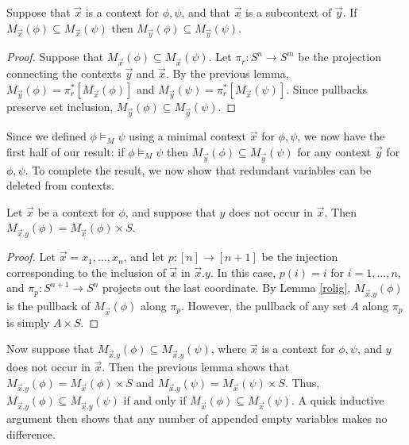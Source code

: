 \begin{prop} Suppose that $\vec{x}$ is a context for $\phi ,\psi$, and
  that $\vec{x}$ is a subcontext of $\vec{y}$.  If
  $M_{\vec{x}}(\phi )\subseteq M_{\vec{x}}(\psi )$ then
  $M_{\vec{y}}(\phi )\subseteq M_{\vec{y}}(\psi
  )$. \label{subcon} \end{prop}

\begin{proof} Suppose that
  $M_{\vec{x}}(\phi )\subseteq M_{\vec{x}}(\psi )$.  Let
  $\pi _r:S^n\to S^m$ be the projection connecting the contexts
  $\vec{y}$ and $\vec{x}$.  By the previous lemma,
  $M_{\vec{y}}(\phi )=\pi _r^*[M_{\vec{x}}(\phi )]$ and
  $M_{\vec{y}}(\psi )=\pi _r^*[M_{\vec{x}}(\psi )]$.  Since pullbacks
  preserve set inclusion,
  $M_{\vec{y}}(\phi )\subseteq M_{\vec{y}}(\psi )$.  \end{proof}

Since we defined $\phi\vDash _M\psi$ using a minimal context $\vec{x}$
for $\phi ,\psi$, we now have the first half of our result: if
$\phi\vDash _M\psi$ then
$M_{\vec{y}}(\phi )\subseteq M_{\vec{y}}(\psi )$ for any context
$\vec{y}$ for $\phi ,\psi$.  To complete the result, we now show that
redundant variables can be deleted from contexts.

\begin{lemma} Let $\vec{x}$ be a context for $\phi$, and suppose that
  $y$ does not occur in $\vec{x}$.  Then
  $M_{\vec{x}.y}(\phi )=M_{\vec{x}}(\phi )\times S$.  \end{lemma}



\begin{proof} Let $\vec{x}=x_1,\dots ,x_n$, and let $p:[n]\to [n+1]$
  be the injection corresponding to the inclusion of $\vec{x}$ in
  $\vec{x}.y$.  In this case, $p(i)=i$ for $i=1,\dots ,n$, and
  $\pi _p:S^{n+1}\to S^n$ projects out the last coordinate.  By Lemma
  \ref{rolig}, $M_{\vec{x}.y}(\phi )$ is the pullback of
  $M_{\vec{x}}(\phi )$ along $\pi _p$.  However, the pullback of any
  set $A$ along $\pi _p$ is simply $A\times S$. \end{proof}

Now suppose that $M_{\vec{x}.y}(\phi )\subseteq M_{\vec{x}.y}(\psi )$,
where $\vec{x}$ is a context for $\phi ,\psi$, and $y$ does not occur
in $\vec{x}$.  Then the previous lemma shows that
$M_{\vec{x}.y}(\phi )=M_{\vec{x}}(\phi )\times S$ and
$M_{\vec{x}.y}(\psi )=M_{\vec{x}}(\psi )\times S$.  Thus,
$M_{\vec{x}.y}(\phi )\subseteq M_{\vec{x}.y}(\psi )$ if and only if
$M_{\vec{x}}(\phi )\subseteq M_{\vec{x}}(\psi )$.  A quick inductive
argument then shows that any number of appended empty variables makes
no difference.

